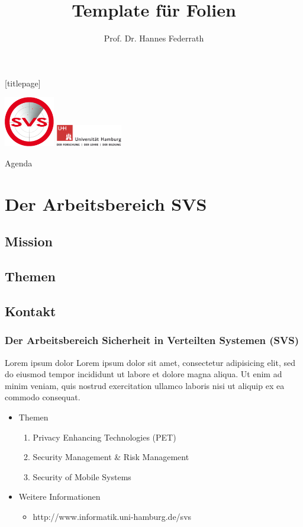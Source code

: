 \documentclass[t]{beamer}
\title{Template für Folien}
\author[Federrath]{Prof. Dr. Hannes Federrath}
\date{}
\begin{document}
\begingroup
	[titlepage]
	\begin{frame}[plain]
		\vskip8mm
		\includegraphics[width=2.2cm]{../pic/svs_logo_uhhred.png}
		\titlepage
		\vspace{\fill}
		\includegraphics[width=2.9cm]{../pic/UHH-Logo_2010_Farbe_RGB_hires_nomargin.png}
		\vskip20pt
	\end{frame}
\endgroup

\begin{frame}{Agenda}
	\tableofcontents
\end{frame}

\section{Der Arbeitsbereich SVS} %
\subsection{Mission} %
\subsection{Themen} %
\subsection{Kontakt} %

\begin{frame}
	\frametitle{Der Arbeitsbereich Sicherheit in Verteilten Systemen (SVS)}
	\begin{block}{Lorem ipsum dolor}
		Lorem ipsum dolor sit amet, consectetur adipisicing elit, sed do eiusmod tempor incididunt ut labore et dolore magna aliqua. Ut enim ad minim veniam, quis nostrud exercitation ullamco laboris nisi ut aliquip ex ea commodo consequat. 
	\end{block}
	\begin{itemize}
		\item Themen
			\begin{enumerate}
				\item Privacy Enhancing Technologies (PET)
				\item Security Management \& Risk Management
				\item Security of Mobile Systems
			\end{enumerate}
		\item Weitere Informationen
			\begin{itemize}
				\item http://www.informatik.uni-hamburg.de/svs
			\end{itemize}
	\end{itemize}
\end{frame}
\end{document}
